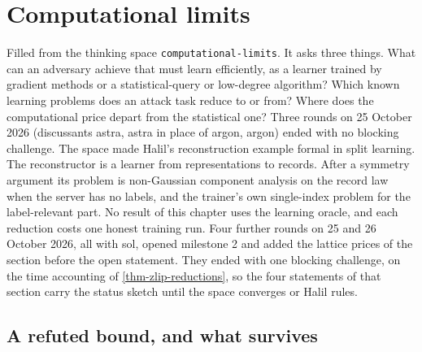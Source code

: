 \chapter{Computational limits}\label{ch:computational-limits}
Filled from the thinking space \texttt{computational-limits}. It asks three things. What
can an adversary achieve that must learn efficiently, as a learner trained by
gradient methods or a statistical-query or low-degree algorithm? Which known
learning problems does an attack task reduce to or from? Where does the
computational price depart from the statistical one? Three rounds on 25 October 2026 (discussants
astra, astra in place of argon, argon) ended with no blocking challenge. The
space made Halil's reconstruction example formal in split learning. The
reconstructor is a learner from representations to records. After a symmetry
argument its problem is non-Gaussian component analysis on the record law when
the server has no labels, and the trainer's own single-index problem for the
label-relevant part. No result of this chapter uses the learning oracle, and
each reduction costs one honest training run. Four further rounds on 25 and 26
October 2026, all with sol, opened milestone 2 and added the lattice prices of the
section before the open statement. They ended with one blocking challenge, on the time
accounting of \cref{thm-zlip-reductions}, so the four statements of that section carry
the status sketch until the space converges or Halil rules.

\section{A refuted bound, and what survives}


